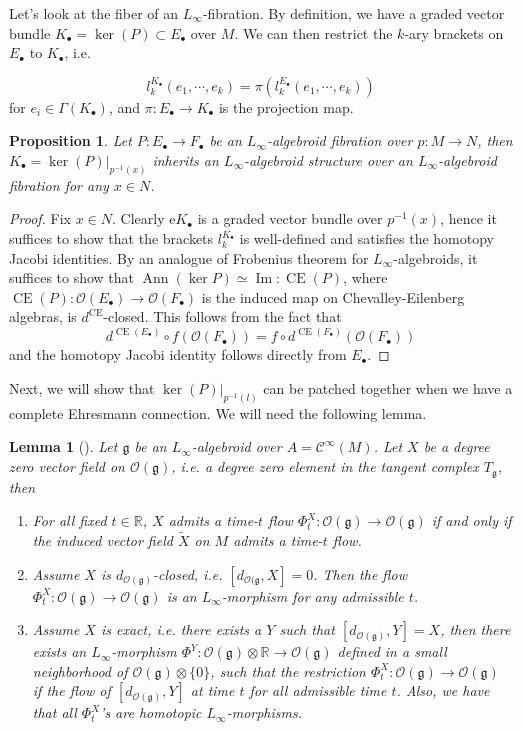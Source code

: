 \documentclass[12pt]{amsart}
\newtheorem{lem}[thm]{Lemma}
\newtheorem{prop}[thm]{Proposition}
\theoremstyle{definition}
\theoremstyle{remark}
\numberwithin{equation}{section}
\newcommand{\CO}{{\mathcal O}}
\newcommand{\cinf}{{\mathcal C}^{\infty}}
\newcommand{\R}{{\mathbb{R}}}
\newcommand{\1}{{\mathbb{1}}}
\newcommand{\g}{\mathfrak{g}}
\newcommand{\CE}{\operatorname{CE}}
\newcommand{\im}{\operatorname{Im}}
\newcommand{\ann}{\operatorname{Ann}}
\newcommand{\li}{L_{\infty}}
\begin{document}
Let's look at the fiber of an $L_{\infty}$-fibration. By definition, we have a graded vector bundle $K_{\bullet} = \ker(P) \subset E_{\bullet}$ over $M$. We can then restrict the $k$-ary brackets on $E_{\bullet}$ to $K_{\bullet}$, i.e.

\begin{equation*}
    l_k^{K_{\bullet}}(e_1,\cdots,e_k) = \pi (l_k^{E_{\bullet}}(e_1,\cdots,e_k))
\end{equation*}
for $e_i \in \Gamma(K_{\bullet})$, and $\pi: E_{\bullet} \to K_{\bullet}$ is the projection map. 
\begin{prop}
Let   $P: E_{\bullet} \to F_{\bullet}$ be an $L_{\infty}$-algebroid fibration over $p: M\to N$, then $K_{\bullet} = \ker(P)|_{p^{-1}(x)}$ inherits an  $L_{\infty}$-algebroid structure over an $L_{\infty}$-algebroid fibration for any $x \in N$.
\end{prop}
\begin{proof}
Fix $x\in N$. Clearly e$K_{\bullet}$ is a graded vector bundle over $p^{-1}(x)$, hence it suffices to show that the brackets $l_k^{K_{\bullet}}$ is well-defined and satisfies the homotopy Jacobi identities. By an analogue of Frobenius theorem for $L_{\infty}$-algebroids, it suffices to show that 
$\ann (\ker P) \simeq \im: \CE(P)$, where $\CE(P): \CO(E_{\bullet}) \to \CO(F_{\bullet})$ is the induced map on Chevalley-Eilenberg algebras, is $d^{\CE}$-closed. This follows from the fact that
$$
d^{\CE(E_{\bullet})}\circ f (\CO(F_{\bullet})) = f \circ d^{\CE(F_{\bullet})}(\CO(F_{\bullet}))
$$
and the homotopy Jacobi identity follows directly from $E_{\bullet}$.
\end{proof}
Next, we will show that $\ker(P)|_{p^{-1}(l)}$ can be patched together when we have a complete Ehresmann connection. We will need the following lemma.
\begin{lem}[\cite{LR19}]
    Let $\g$ be an $L_{\infty}$-algebroid over $A = \cinf(M)$. 
    Let $X$ be a degree zero vector field on $\CO(\g)$, i.e. a degree zero element in the tangent complex $T_{\g}$, then
    \begin{enumerate}
        \item For all fixed $t\in \R$, $X$ admits a time-$t$ flow $\Phi^X_t: \CO(\g) \to \CO(\g)$ if and only if the induced vector field $\tilde{X}$ on $M$ admits a time-$t$ flow.
        \item Assume $X$ is $d_{\CO(\g)}$-closed, i.e. $[d_{\CO(\g}, X] = 0$. Then the flow $\Phi^X_t: \CO(\g) \to \CO(\g)$ is an $L_{\infty}$-morphism for any admissible $t$.
        \item Assume $X$ is exact, i.e. there exists a $Y$ such that $[d_{\CO(\g)}, Y] = X$, then there exists an $\li$-morphism $\Phi^Y: \CO(\g) \otimes \R \to \CO(\g)$ defined in a small neighborhood of $\CO(\g) \otimes \{0\}$, such that the restriction $\Phi^X_t: \CO(\g) \to \CO(\g)$ if the flow of $[d_{\CO(\g)}, Y]$ at time $t$ for all admissible time $t$. Also, we have that all $\Phi^X_t$'s are homotopic $\li$-morphisms.
    \end{enumerate}
\end{lem}
\end{document}
